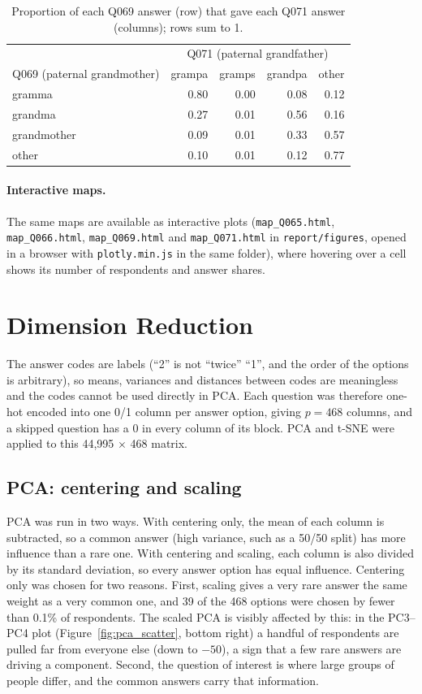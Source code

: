 \documentclass[10pt,letterpaper]{article}
\begin{document}
\begin{table}[h]
\centering
\small
\begin{tabular}{lrrrr}
\hline
 & \multicolumn{4}{c}{Q071 (paternal grandfather)} \\
Q069 (paternal grandmother) & grampa & gramps & grandpa & other \\
\hline
gramma & 0.80 & 0.00 & 0.08 & 0.12 \\
grandma & 0.27 & 0.01 & 0.56 & 0.16 \\
grandmother & 0.09 & 0.01 & 0.33 & 0.57 \\
other & 0.10 & 0.01 & 0.12 & 0.77 \\
\hline
\end{tabular}
\caption{Proportion of each Q069 answer (row) that gave each Q071 answer (columns); rows sum to 1.}
\label{tab:cond}
\end{table}

\paragraph{Interactive maps.} The same maps are available as interactive plots (\texttt{map\_Q065.html}, \texttt{map\_Q066.html}, \texttt{map\_Q069.html} and \texttt{map\_Q071.html} in \texttt{report/figures}, opened in a browser with \texttt{plotly.min.js} in the same folder), where hovering over a cell shows its number of respondents and answer shares.

\section{Dimension Reduction}\label{dimension-reduction}

The answer codes are labels (``2'' is not ``twice'' ``1'', and the order of the options is arbitrary), so means, variances and distances between codes are meaningless and the codes cannot be used directly in PCA. Each question was therefore one-hot encoded into one 0/1 column per answer option, giving $p = 468$ columns, and a skipped question has a 0 in every column of its block. PCA and t-SNE were applied to this 44{,}995 $\times$ 468 matrix.

\subsection{PCA: centering and scaling}

PCA was run in two ways. With centering only, the mean of each column is subtracted, so a common answer (high variance, such as a 50/50 split) has more influence than a rare one. With centering and scaling, each column is also divided by its standard deviation, so every answer option has equal influence. Centering only was chosen for two reasons. First, scaling gives a very rare answer the same weight as a very common one, and 39 of the 468 options were chosen by fewer than 0.1\% of respondents. The scaled PCA is visibly affected by this: in the PC3--PC4 plot (Figure~\ref{fig:pca_scatter}, bottom right) a handful of respondents are pulled far from everyone else (down to $-50$), a sign that a few rare answers are driving a component. Second, the question of interest is where large groups of people differ, and the common answers carry that information.
\end{document}
